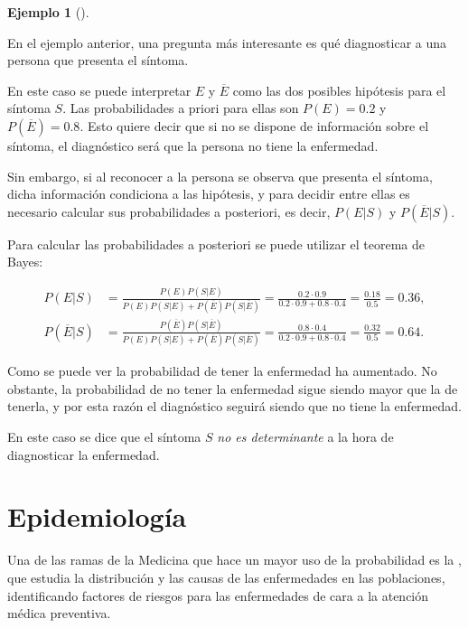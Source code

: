 \documentclass[
  a4paper,
]{scrreport}
\theoremstyle{plain}
\theoremstyle{definition}
\theoremstyle{definition}
\newtheorem{example}{Ejemplo}[chapter]
\theoremstyle{remark}
\begin{document}
\begin{example}[]\protect\hypertarget{exm-teorema-bayes}{}\label{exm-teorema-bayes}

En el ejemplo anterior, una pregunta más interesante es qué diagnosticar
a una persona que presenta el síntoma.

En este caso se puede interpretar \(E\) y \(\overline{E}\) como las dos
posibles hipótesis para el síntoma \(S\). Las probabilidades a priori
para ellas son \(P(E)=0.2\) y \(P(\overline E)=0.8\). Esto quiere decir
que si no se dispone de información sobre el síntoma, el diagnóstico
será que la persona no tiene la enfermedad.

Sin embargo, si al reconocer a la persona se observa que presenta el
síntoma, dicha información condiciona a las hipótesis, y para decidir
entre ellas es necesario calcular sus probabilidades a posteriori, es
decir, \(P(E|S)\) y \(P(\overline{E}|S)\).

Para calcular las probabilidades a posteriori se puede utilizar el
teorema de Bayes:

\begin{align*}
P(E|S) &= \frac{P(E)P(S|E)}{P(E)P(S|E)+P(\overline{E})P(S|\overline{E})} = \frac{0.2\cdot 0.9}{0.2\cdot 0.9 + 0.8\cdot 0.4} = \frac{0.18}{0.5}=0.36,\\
P(\overline{E}|S) &= \frac{P(\overline{E})P(S|\overline{E})}{P(E)P(S|E)+P(\overline{E})P(S|\overline{E})} = \frac{0.8\cdot 0.4}{0.2\cdot 0.9 + 0.8\cdot 0.4} = \frac{0.32}{0.5}=0.64.
\end{align*}

Como se puede ver la probabilidad de tener la enfermedad ha aumentado.
No obstante, la probabilidad de no tener la enfermedad sigue siendo
mayor que la de tenerla, y por esta razón el diagnóstico seguirá siendo
que no tiene la enfermedad.

En este caso se dice que el síntoma \(S\) \emph{no es determinante} a la
hora de diagnosticar la enfermedad.

\end{example}

\section{Epidemiología}\label{epidemiologuxeda}

Una de las ramas de la Medicina que hace un mayor uso de la probabilidad
es la , que estudia la distribución y las causas de las enfermedades en
las poblaciones, identificando factores de riesgos para las enfermedades
de cara a la atención médica preventiva.
\end{document}
